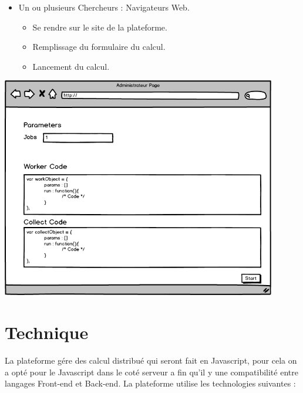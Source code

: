 \documentclass[a4paper]{article}
\begin{document}
\begin{itemize}
\item Un ou plusieurs Chercheurs : Navigateurs Web.
\begin{itemize}
\item Se rendre sur le site de la plateforme.
\item Remplissage du formulaire du calcul.
\item Lancement du calcul. 
\end{itemize} 
\end{itemize}

\begin{center}
\centering
\includegraphics[width=0.9\textwidth]{IntChercheur.png}
\end{center}

\section{Technique}

La plateforme gére des calcul distribué qui seront fait en Javascript, pour cela on a opté pour le Javascript dans le coté serveur a fin qu'il y une compatibilité entre langages Front-end et Back-end. La plateforme utilise les technologies suivantes :
\end{document}

